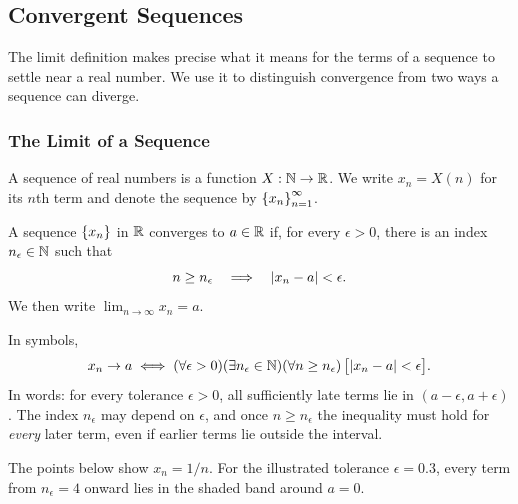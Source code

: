 
\subsection{Convergent Sequences}
The limit definition makes precise what it means for the terms of a sequence to settle near a real number. We use it to distinguish convergence from two ways a sequence can diverge.
\subsubsection{The Limit of a Sequence}

A sequence of real numbers is a function $X:\mathbb{N}\to\mathbb{R}$. We write $x_n=X(n)$ for its $n$th term and denote the sequence by $\left\{x_n\right\}_{n=1}^{\infty}$.

\begin{definition}\label{def:limit}
    A sequence $\left\{x_n\right\}$ in $\mathbb{R}$ converges to $a\in\mathbb{R}$ if, for every $\epsilon>0$, there is an index $n_\epsilon\in\mathbb{N}$ such that
    \[
        n\geq n_\epsilon \quad\Longrightarrow\quad \left|x_n-a\right|<\epsilon.
    \]
    We then write $\lim_{n\to\infty}x_n=a$.
\end{definition}

In symbols,
\[
    x_n\to a \iff (\forall\epsilon>0)(\exists n_\epsilon\in\mathbb{N})(\forall n\geq n_\epsilon)\,\bigl[\left|x_n-a\right|<\epsilon\bigr].
\]
In words: for every tolerance $\epsilon>0$, all sufficiently late terms lie in $(a-\epsilon,a+\epsilon)$. The index $n_\epsilon$ may depend on $\epsilon$, and once $n\geq n_\epsilon$ the inequality must hold for \emph{every} later term, even if earlier terms lie outside the interval.

The points below show $x_n=1/n$. For the illustrated tolerance $\epsilon=0.3$, every term from $n_\epsilon=4$ onward lies in the shaded band around $a=0$.

\begin{center}
\end{center}

